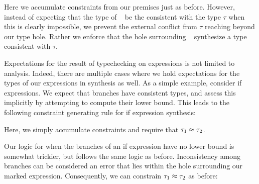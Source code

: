 Here we accumulate constraints from our premises just as before. However, instead of expecting that the type of \ECMV~ be the consistent with the type $\tau$ when this is clearly impossible, we prevent the external conflict from $\tau$ reaching beyond our type hole. Rather we enforce that the hole surrounding \ECMV~ synthesize a type consistent with $\tau$.

Expectations for the result of typechecking on expressions is not limited to analysis. Indeed, there are multiple cases where we hold expectations for the types of our expressions in synthesis as well. As a simple example, consider if expressions. We expect that branches have consistent types, and assess this implicitly by attempting to compute their lower bound. This leads to the following constraint generating rule for if expression synthesis:

\begin{mathpar}
\end{mathpar}

Here, we simply accumulate constraints and require that $\TMV_1 \approx \TMV_2$. 

Our logic for when the branches of an if expression have no lower bound is somewhat trickier, but follows the same logic as before. Inconsistency among branches can be considered an error that lies within the hole surrounding our marked expression. Consequently, we can constrain $\TMV_1 \approx \TMV_2$ as before:

\begin{mathpar}
\end{mathpar}

